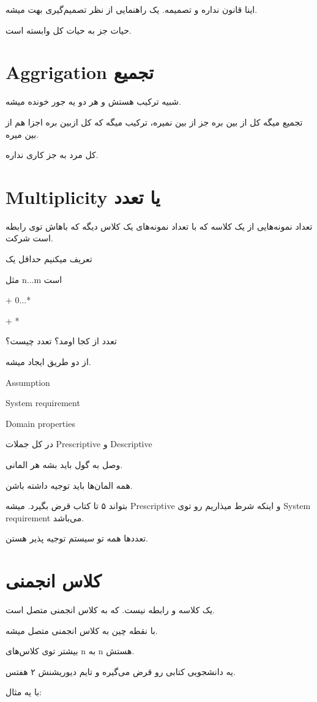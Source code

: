 اینا قانون نداره و تصمیمه. یک راهنمایی از نظر تصمیم‌گیری بهت میشه.

حیات جز به حیات کل وابسته است.

\section{Aggrigation تجمیع}

شبیه ترکیب هستش و هر دو یه جور خونده میشه. 

تجمیع میگه کل از بین بره جز از بین نمیره، ترکیب میگه که کل ازبین بره اجزا هم از
بین میره.

کل مرد به جز کاری نداره.

\section{Multiplicity یا تعدد }

تعداد نمونه‌هایی از یک کلاسه که با تعداد نمونه‌های یک کلاس دیگه که باهاش توی
رابطه است شرکت.

تعریف میکنیم حداقل یک

مثل n...m است

+ 0...*

+ *

تعدد از کجا اومد؟ تعدد چیست؟

از دو طریق ایجاد میشه.

Assumption

System requirement

Domain properties

در کل جملات Prescriptive و Descriptive

وصل به گول باید بشه هر المانی.

همه المان‌ها باید توجیه داشته باشن.

بتواند ۵ تا کتاب قرض بگیرد. میشه Prescriptive و اینکه شرط میذاریم رو توی System
requirement می‌باشد.

تعدد‌ها همه تو سیستم توجیه پذیر هستن.

\section{کلاس انجمنی}

یک کلاسه و رابطه نیست. که به کلاس انجمنی متصل است.

با نقطه چین به کلاس انجمنی متصل میشه.

بیشتر توی کلاس‌های n به n هستش.

یه دانشجویی کتابی رو قرض می‌گیره و تایم دیوریشنش ۲ هفتس.

با یه مثال:

